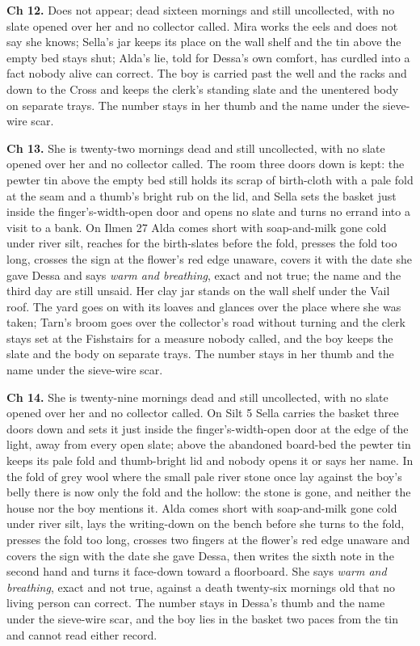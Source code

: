 \documentclass{design/chronicle}
\begin{document}
{\textbf{Ch 12.} Does not appear; dead sixteen mornings and still uncollected, with no slate opened over her and no collector called. Mira works the eels and does not say she knows; Sella’s jar keeps its place on the wall shelf and the tin above the empty bed stays shut; Alda’s lie, told for Dessa’s own comfort, has curdled into a fact nobody alive can correct. The boy is carried past the well and the racks and down to the Cross and keeps the clerk’s standing slate and the unentered body on separate trays. The number stays in her thumb and the name under the sieve-wire scar.

\textbf{Ch 13.} She is twenty-two mornings dead and still uncollected, with no slate opened over her and no collector called. The room three doors down is kept: the pewter tin above the empty bed still holds its scrap of birth-cloth with a pale fold at the seam and a thumb’s bright rub on the lid, and Sella sets the basket just inside the finger’s-width-open door and opens no slate and turns no errand into a visit to a bank. On Ilmen 27 Alda comes short with soap-and-milk gone cold under river silt, reaches for the birth-slates before the fold, presses the fold too long, crosses the sign at the flower’s red edge unaware, covers it with the date she gave Dessa and says \emph{warm and breathing}, exact and not true; the name and the third day are still unsaid. Her clay jar stands on the wall shelf under the Vail roof. The yard goes on with its loaves and glances over the place where she was taken; Tarn’s broom goes over the collector’s road without turning and the clerk stays set at the Fishstairs for a measure nobody called, and the boy keeps the slate and the body on separate trays. The number stays in her thumb and the name under the sieve-wire scar.

\textbf{Ch 14.} She is twenty-nine mornings dead and still uncollected, with no slate opened over her and no collector called. On Silt 5 Sella carries the basket three doors down and sets it just inside the finger’s-width-open door at the edge of the light, away from every open slate; above the abandoned board-bed the pewter tin keeps its pale fold and thumb-bright lid and nobody opens it or says her name. In the fold of grey wool where the small pale river stone once lay against the boy’s belly there is now only the fold and the hollow: the stone is gone, and neither the house nor the boy mentions it. Alda comes short with soap-and-milk gone cold under river silt, lays the writing-down on the bench before she turns to the fold, presses the fold too long, crosses two fingers at the flower’s red edge unaware and covers the sign with the date she gave Dessa, then writes the sixth note in the second hand and turns it face-down toward a floorboard. She says \emph{warm and breathing}, exact and not true, against a death twenty-six mornings old that no living person can correct. The number stays in Dessa’s thumb and the name under the sieve-wire scar, and the boy lies in the basket two paces from the tin and cannot read either record.

}
\end{document}
